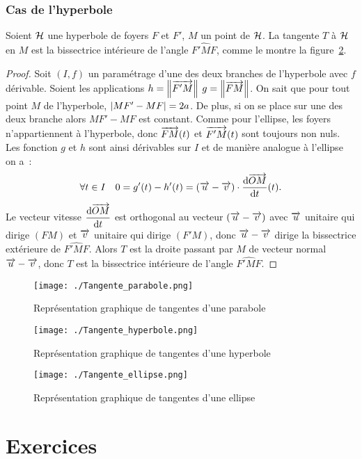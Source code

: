 \subsubsection{Cas de l'hyperbole}
\begin{prop}
    Soient \(\mathcal{H}\) une hyperbole de foyers \(F\) et \(F'\), \(M\) un point de \(\mathcal{H}\). La tangente \(T\) à \(\mathcal{H}\) en \(M\) est la bissectrice intérieure de l'angle \(\widehat{F'MF}\), comme le montre la figure~\ref{fig:tangente_hyperbole}.
\end{prop}
\begin{proof}
  Soit \((I,f)\) un paramétrage d'une des deux branches de l'hyperbole avec \(f\) dérivable. Soient les applications \(h=\left\lVert\overrightarrow{F'M}\right\rVert\) \(g=\left\lVert\overrightarrow{FM}\right\rVert\). On sait que pour tout point \(M\) de l'hyperbole, \(\left\lvert MF'-MF\right\rvert=2a\). De plus, si on se place sur une des deux branche alors \(MF'-MF\) est constant. Comme pour l'ellipse, les foyers n'appartiennent à l'hyperbole, donc \(\overrightarrow{FM}(t)\) et \(\overrightarrow{F'M}(t)\) sont toujours non nuls. Les fonction \(g\) et \(h\) sont ainsi dérivables sur \(I\) et de manière analogue à l'ellipse on a~:
\begin{equation}
\forall t \in I \quad 0=g'(t)-h'(t)=(\overrightarrow{u}-\overrightarrow{v})\cdot \dfrac{\mathrm{d} \overrightarrow{OM}}{\mathrm{d} t}(t).
\end{equation}
 Le vecteur vitesse \(\dfrac{\mathrm{d} \overrightarrow{OM}}{\mathrm{d} t}\) est orthogonal au vecteur \((\overrightarrow{u}-\overrightarrow{v})\) avec \(\overrightarrow{u}\) unitaire qui dirige \((FM)\) et \(\overrightarrow{v}\) unitaire qui dirige \((F'M)\), donc \(\overrightarrow{u}-\overrightarrow{v}\) dirige la bissectrice extérieure de \(\widehat{F'MF}\). Alors \(T\) est la droite passant par \(M\) de vecteur normal \(\overrightarrow{u}-\overrightarrow{v}\), donc \(T\) est la bissectrice intérieure de l'angle \(\widehat{F'MF}\).
\end{proof}
\begin{figure}
    \centering
    \texttt{[image: ./Tangente\_parabole.png]}
    \caption{Représentation graphique de tangentes d'une parabole}
    \label{fig:tangente_parabole}
\end{figure}
\begin{figure}
    \centering
    \texttt{[image: ./Tangente\_hyperbole.png]}
    \caption{Représentation graphique de tangentes d'une hyperbole}
    \label{fig:tangente_hyperbole}
\end{figure}
\begin{figure}
    \centering
    \texttt{[image: ./Tangente\_ellipse.png]}
    \caption{Représentation graphique de tangentes d'une ellipse}
    \label{fig:tangente_ellipse}
\end{figure}
\section{Exercices}

